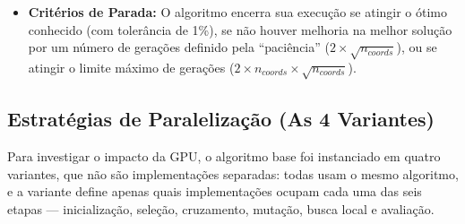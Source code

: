 \begin{itemize}
O mesmo valor de \(\kappa\), o mesmo limite de passadas e a mesma regra de aceitação são usados nas quatro variantes; o que muda entre elas é o modo de avaliação dos candidatos e, acima do limite de memória compartilhada, o fatiamento da varredura em janelas, regime que nenhuma instância deste trabalho alcança (\hyperref[sec-5311-semantica-operadores]{Seção 5.3.1.1}).
  \item
        \textbf{Critérios de Parada:} O algoritmo encerra sua execução se atingir o ótimo conhecido (com tolerância de 1\%), se não houver melhoria na melhor solução por um número de gerações definido pela ``paciência'' (\(2 \times \sqrt{n_{coords}}\)), ou se atingir o limite máximo de gerações (\(2 \times n_{coords} \times \sqrt{n_{coords}}\)).
\end{itemize}

\subsection{Estratégias de Paralelização (As 4 Variantes)}\label{sec-322-variantes}

Para investigar o impacto da GPU, o algoritmo base foi instanciado em quatro variantes, que não são implementações separadas: todas usam o mesmo algoritmo, e a variante define apenas quais implementações ocupam cada uma das seis etapas --- inicialização, seleção, cruzamento, mutação, busca local e avaliação.

